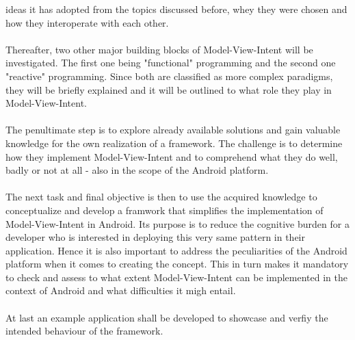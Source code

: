 ideas it has adopted from the topics discussed before, whey they were chosen and how they interoperate with each other.
\\
\\
Thereafter, two other major building blocks of Model-View-Intent will be investigated. The first one being "functional" programming and the second one "reactive" programming.
Since both are classified as more complex paradigms, they will be briefly explained and it will be outlined to what role they play in Model-View-Intent.
\\
\\
The penultimate step is to explore already available solutions and gain valuable knowledge for the own realization of a framework. The challenge is to determine
how they implement Model-View-Intent and to comprehend what they do well, badly or not at all - also in the scope of the Android platform.
\\
\\
The next task and final objective is then to use the acquired knowledge to conceptualize and develop a framwork that simplifies the implementation of Model-View-Intent in Android. 
Its purpose is to reduce the cognitive burden for a developer who is interested in deploying this very same pattern in their application. Hence it is also important to address the 
peculiarities of the Android platform when it comes to creating the concept. This in turn makes it mandatory to check and assess to what extent Model-View-Intent can be implemented 
in the context of Android and what difficulties it migh entail.
\\
\\
At last an example application shall be developed to showcase and verfiy the intended behaviour of the framework.